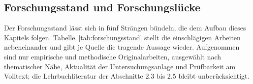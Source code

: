 \documentclass[12pt,a4paper]{article}
\begin{document}

\subsection{Forschungsstand und Forschungslücke}
\label{sec:forschungsluecke}

Der Forschungsstand lässt sich in fünf Strängen bündeln, die dem Aufbau dieses Kapitels folgen. Tabelle~\ref{tab:forschungsstand} stellt die einschlägigen Arbeiten nebeneinander und gibt je Quelle die tragende Aussage wieder. Aufgenommen sind nur empirische und methodische Originalarbeiten, ausgewählt nach thematischer Nähe, Aktualität der Untersuchungsanlage und Prüfbarkeit am Volltext; die Lehrbuchliteratur der Abschnitte 2.3 bis 2.5 bleibt unberücksichtigt.
\end{document}
